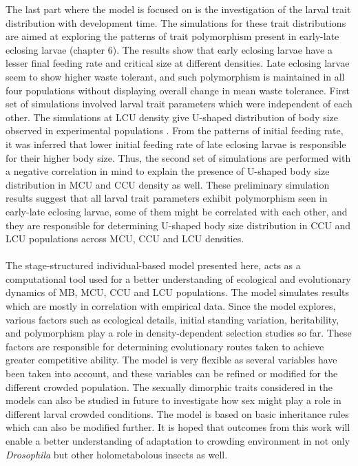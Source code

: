 The last part where the model is focused on is the investigation of the larval trait distribution with development time. The simulations for these trait distributions are aimed at exploring the patterns of trait polymorphism present in early-late eclosing larvae (chapter 6). The results show that early eclosing larvae have a lesser final feeding rate and critical size at different densities. Late eclosing larvae seem to show higher waste tolerant, and such polymorphism is maintained in all four populations without displaying overall change in mean waste tolerance. First set of simulations involved larval trait parameters which were independent of each other. The simulations at LCU density give U-shaped distribution of body size observed in experimental populations \citep{sarangiEcologicalDetailsMediate2018}. From the patterns of initial feeding rate, it was inferred that lower initial feeding rate of late eclosing larvae is responsible for their higher body size. Thus, the second set of simulations are performed with a negative correlation in mind to explain the presence of U-shaped body size distribution in MCU and CCU density as well. These preliminary simulation results suggest that all larval trait parameters exhibit polymorphism seen in early-late eclosing larvae, some of them might be correlated with each other, and they are responsible for determining U-shaped body size distribution in CCU and LCU populations across MCU, CCU and LCU densities.\\\\
The stage-structured individual-based model presented here, acts as a computational tool used for a better understanding of ecological and evolutionary dynamics of MB, MCU, CCU and LCU populations. The model simulates results which are mostly in correlation with empirical data. Since the model explores, various factors such as ecological details, initial standing variation, heritability, and polymorphism play a role in density-dependent selection studies so far. These factors are responsible for determining evolutionary routes taken to achieve greater competitive ability. The model is very flexible as several variables have been taken into account, and these variables can be refined or modified for the different crowded population. The sexually dimorphic traits considered in the models can also be studied in future to investigate how sex might play a role in different larval crowded conditions. The model is based on basic inheritance rules which can also be modified further. It is hoped that outcomes from this work will enable a better understanding of adaptation to crowding environment in not only \textit{Drosophila} but other holometabolous insects as well.
\pagebreak
